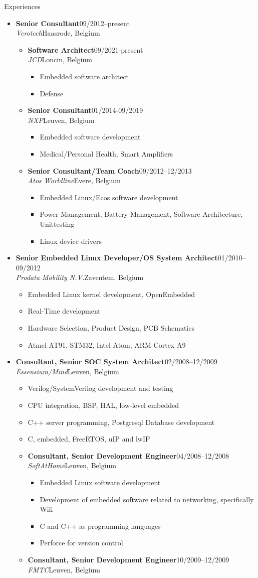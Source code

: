 \documentclass[12pt,oneside]{article}
\newenvironment{ressection}[1]{
	\vspace{5pt}
	{\selectfont\Large#1}
	\begin{itemize}
	\vspace{5pt}
}{
	\end{itemize}
}
\newcommand{\ressubitem}[1]{
	\vspace{-4pt}
	\item \begin{flushleft} #1 \end{flushleft}
}
\newcommand{\resbigitem}[4]{
	\vspace{-5pt}
	\item
	\textbf{#1}\hfill#4 \\
	\textit{#2}\hfill#3
}
\newenvironment{ressubsec}[4]{
	\resbigitem{#1}{#2}{#3}{#4}
	\vspace{-2pt}
	\begin{itemize}
}{
	\end{itemize}
}
\newenvironment{ressubsubsec}[4]{
	\vspace{5pt}
	\resbigitem{#1}{#2}{#3}{#4}
	\begin{itemize}
}{
	\end{itemize}
}
\newcommand{\ressubsubitem}[1]{
	\vspace{-1pt}
	\item \begin{flushleft} #1 \end{flushleft}
}
\begin{document}
\begin{ressection}{Experiences}
	\begin{ressubsec}{Senior Consultant}{Verotech}{Haasrode, Belgium}{09/2012--present}
        \begin{ressubsubsec}{Software Architect}{JCD}{Loncin, Belgium}{09/2021-present}
            \ressubsubitem{Embedded software architect}
            \ressubsubitem{Defense}
        \end{ressubsubsec}
		\begin{ressubsubsec}{Senior Consultant}{NXP}{Leuven, Belgium}{01/2014-09/2019}
			\ressubsubitem{Embedded software development}
			\ressubsubitem{Medical/Personal Health, Smart Amplifiers}
		\end{ressubsubsec}
		\begin{ressubsubsec}{Senior Consultant/Team Coach}{Atos Worldline}{Evere, Belgium}{09/2012--12/2013}
			\ressubsubitem{Embedded Linux/Ecos software development}
			\ressubsubitem{Power Management, Battery Management, Software Architecture, Unittesting}
			\ressubsubitem{Linux device drivers}
		\end{ressubsubsec}
	\end{ressubsec}
	\begin{ressubsec}{Senior Embedded Linux Developer/OS System Architect}{Prodata Mobility N.V.}{Zaventem, Belgium}{01/2010--09/2012}
		\ressubsubitem{Embedded Linux kernel development, OpenEmbedded}
		\ressubsubitem{Real-Time development}
		\ressubsubitem{Hardware Selection, Product Design, PCB Schematics}
		\ressubsubitem{Atmel AT91, STM32, Intel Atom, ARM Cortex A9}
	\end{ressubsec}
	\begin{ressubsec}{Consultant, Senior SOC System Architect}{Essensium/Mind}{Leuven, Belgium}{02/2008--12/2009}
		\ressubitem{Verilog/SystemVerilog development and testing}
		\ressubitem{CPU integration, BSP, HAL, low-level embedded}
		\ressubitem{C++ server programming, Postgresql Database development}
		\ressubitem{C, embedded, FreeRTOS, uIP and lwIP}
		\begin{ressubsubsec}{Consultant, Senior Development Engineer}{SoftAtHome}{Leuven, Belgium}{04/2008--12/2008}
			\ressubsubitem{Embedded Linux software development}
			\ressubsubitem{Development of embedded software related to networking, specifically Wifi}
			\ressubsubitem{C and C++ as programming languages}
			\ressubsubitem{Perforce for version control}
		\end{ressubsubsec}
		\begin{ressubsubsec}{Consultant, Senior Development Engineer}{FMTC}{Leuven, Belgium}{10/2009--12/2009}

\end{ressubsubsec}
\end{ressubsec}
\end{ressection}
\end{document}

